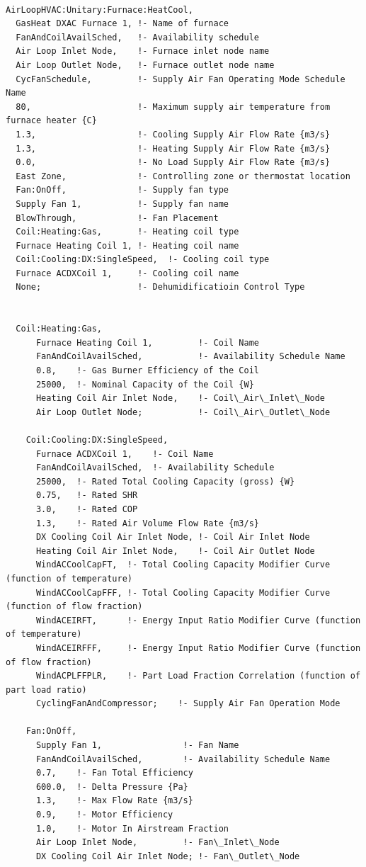\begin{lstlisting}

AirLoopHVAC:Unitary:Furnace:HeatCool,
  GasHeat DXAC Furnace 1, !- Name of furnace
  FanAndCoilAvailSched,   !- Availability schedule
  Air Loop Inlet Node,    !- Furnace inlet node name
  Air Loop Outlet Node,   !- Furnace outlet node name
  CycFanSchedule,         !- Supply Air Fan Operating Mode Schedule Name
  80,                     !- Maximum supply air temperature from furnace heater {C}
  1.3,                    !- Cooling Supply Air Flow Rate {m3/s}
  1.3,                    !- Heating Supply Air Flow Rate {m3/s}
  0.0,                    !- No Load Supply Air Flow Rate {m3/s}
  East Zone,              !- Controlling zone or thermostat location
  Fan:OnOff,              !- Supply fan type
  Supply Fan 1,           !- Supply fan name
  BlowThrough,            !- Fan Placement
  Coil:Heating:Gas,       !- Heating coil type
  Furnace Heating Coil 1, !- Heating coil name
  Coil:Cooling:DX:SingleSpeed,  !- Cooling coil type
  Furnace ACDXCoil 1,     !- Cooling coil name
  None;                   !- Dehumidificatioin Control Type


  Coil:Heating:Gas,
      Furnace Heating Coil 1,         !- Coil Name
      FanAndCoilAvailSched,           !- Availability Schedule Name
      0.8,    !- Gas Burner Efficiency of the Coil
      25000,  !- Nominal Capacity of the Coil {W}
      Heating Coil Air Inlet Node,    !- Coil\_Air\_Inlet\_Node
      Air Loop Outlet Node;           !- Coil\_Air\_Outlet\_Node

    Coil:Cooling:DX:SingleSpeed,
      Furnace ACDXCoil 1,    !- Coil Name
      FanAndCoilAvailSched,  !- Availability Schedule
      25000,  !- Rated Total Cooling Capacity (gross) {W}
      0.75,   !- Rated SHR
      3.0,    !- Rated COP
      1.3,    !- Rated Air Volume Flow Rate {m3/s}
      DX Cooling Coil Air Inlet Node, !- Coil Air Inlet Node
      Heating Coil Air Inlet Node,    !- Coil Air Outlet Node
      WindACCoolCapFT,  !- Total Cooling Capacity Modifier Curve (function of temperature)
      WindACCoolCapFFF, !- Total Cooling Capacity Modifier Curve (function of flow fraction)
      WindACEIRFT,      !- Energy Input Ratio Modifier Curve (function of temperature)
      WindACEIRFFF,     !- Energy Input Ratio Modifier Curve (function of flow fraction)
      WindACPLFFPLR,    !- Part Load Fraction Correlation (function of part load ratio)
      CyclingFanAndCompressor;    !- Supply Air Fan Operation Mode

    Fan:OnOff,
      Supply Fan 1,                !- Fan Name
      FanAndCoilAvailSched,        !- Availability Schedule Name
      0.7,    !- Fan Total Efficiency
      600.0,  !- Delta Pressure {Pa}
      1.3,    !- Max Flow Rate {m3/s}
      0.9,    !- Motor Efficiency
      1.0,    !- Motor In Airstream Fraction
      Air Loop Inlet Node,         !- Fan\_Inlet\_Node
      DX Cooling Coil Air Inlet Node; !- Fan\_Outlet\_Node


\end{lstlisting}
